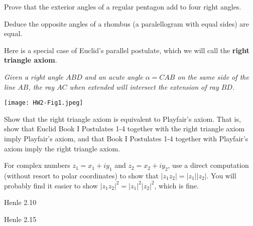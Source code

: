 \documentclass[minion]{homework}
\begin{document}
\begin{problems}

\problem Prove that the exterior angles of a regular pentagon add to four right angles.

\problem Deduce the opposite angles of a rhombus (a paralellogram with equal sides) are equal.

\problem Here is a special case of Euclid's parallel postulate, which we will call the
\textbf{right triangle axiom}.

\textit{Given a right angle $ABD$ and an acute angle $\alpha = CAB$ on the same side of the line $AB$,
the ray $AC$ when extended will intersect the extension of ray $BD$.}


\hfil\texttt{[image: HW2-Fig1.jpeg]}

Show that the right triangle axiom is equivalent to Playfair's axiom. That is, show that Euclid Book I Postulates 1-4 together with the right triangle axiom imply Playfair's axiom, and that 
Book I Postulates 1-4 together with Playfair's axiom imply the right triangle axiom.

\problem For complex numbers $z_1=x_1+iy_1$ and $z_2=x_2+iy_2$, use a direct computation (without resort to polar coordinates) to show that $|z_1z_2|=|z_1||z_2|$.
You will probably find it easier to show
$|z_1z_2|^2=|z_1|^2|z_2|^2$, which is fine.

\problem Henle 2.10

\problem Henle 2.15

\end{problems}
\end{document}
